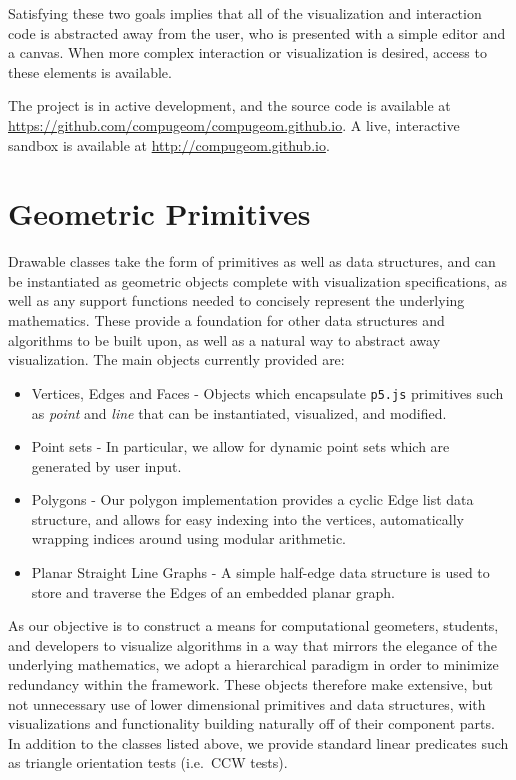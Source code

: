\documentclass[a4paper,UKenglish]{lipics-v2016}
\begin{document}
  Satisfying these two goals implies that all of the visualization and interaction code is abstracted away from the user, who is presented with a simple editor and a canvas.
  When more complex interaction or visualization is desired, access to these elements is available.
  
  The project is in active development, and the source code is available at \url{https://github.com/compugeom/compugeom.github.io}.  
  A live, interactive sandbox is available at \url{http://compugeom.github.io}.
  
  


\section{Geometric Primitives} %
\label{sec:geometric_primitives} 

  Drawable classes take the form of primitives as well as data structures, and can be instantiated as geometric objects complete with visualization specifications, as well as any support functions needed to concisely represent the underlying mathematics.
  These provide a foundation for other data structures and algorithms to be built upon, as well as a natural way to abstract away visualization.
  The main objects currently provided are:
  \begin{itemize}
    \item Vertices, Edges and Faces - Objects which encapsulate \texttt{p5.js} primitives such as \emph{point} and \emph{line} that can be instantiated, visualized, and modified.
    \item Point sets - In particular, we allow for dynamic point sets which are generated by user input.
    \item Polygons - Our polygon implementation provides a cyclic Edge list data structure, and allows for easy indexing into the vertices, automatically wrapping indices around using modular arithmetic.
    \item Planar Straight Line Graphs - A simple half-edge data structure is used to store and traverse the Edges of an embedded planar graph.
  \end{itemize}
  As our objective is to construct a means for computational geometers, students, and developers to visualize algorithms in a way that mirrors the elegance of the underlying mathematics, we adopt a hierarchical paradigm in order to minimize redundancy within the framework. 
  These objects therefore make extensive, but not unnecessary use of lower dimensional primitives and data structures, with visualizations and functionality building naturally off of their component parts.
  In addition to the classes listed above, we provide standard linear predicates such as triangle orientation tests (i.e.\ CCW tests).
\end{document}
